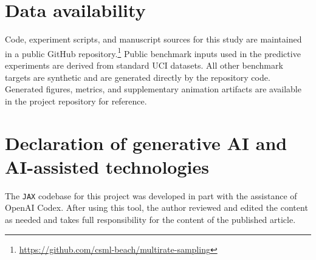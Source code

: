 \section*{Data availability}

Code, experiment scripts, and manuscript sources for this study are maintained
in a public GitHub repository.\footnote{\url{https://github.com/csml-beach/multirate-sampling}}
Public benchmark inputs used in the predictive experiments are derived from
standard UCI datasets. All other benchmark targets are synthetic and are
generated directly by the repository code. Generated figures, metrics, and
supplementary animation artifacts are available in the project repository for
reference.

\section*{Declaration of generative AI and AI-assisted technologies}

The \texttt{JAX} codebase for this project was developed in part with the assistance of OpenAI Codex. After using this tool, the author reviewed and edited the content as needed and takes full responsibility for the content of the published article.